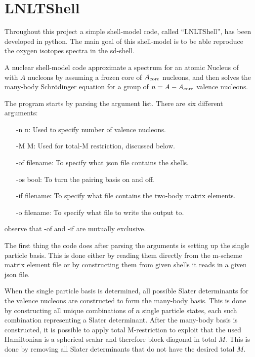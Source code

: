 \section{LNLTShell} \label{sec:CodeExpl}

Throughout this project a simple shell-model code, called ``LNLTShell'', has been developed in python. The main goal of this shell-model is to be able reproduce the oxygen isotopes spectra in the sd-shell.

A nuclear shell-model code approximate a spectrum for an atomic Nucleus of with \(A\) nucleons by assuming a frozen core of \(A_{\rm{core}}\) nucleons, and then solves the many-body Schrödinger equation %
for a group of \(n=A-A_{\rm{core}}\) valence nucleons.



The program starts by parsing the argument list. There are six different arguments:
\begin{itemize}
\item[-n n:] Used to specify number of valence nucleons.
\item[-M M:] Used for total-M restriction, discussed below.
\item[-of filename:] To specify what json file contains the shells.
\item[-os bool:] To turn the pairing basis on and off.
\item[-if filename:] To specify what file contains the two-body matrix elements.
\item[-o filename:] To specify what file to write the output to.
\end{itemize}
observe that -of and -if are mutually exclusive.




The first thing the code does after parsing the arguments is setting up the single particle basis.
This is done either by reading them directly from the m-scheme matrix element file %
or by constructing them from given shells it reads in a given json file.



When the single particle basis is determined, all possible Slater determinants for the valence nucleons are constructed to form the many-body basis.
This is done by constructing all unique combinations of \(n\) single particle states, each such combination representing a Slater determinant.
After the many-body basis is constructed, it is possible to apply total M-restriction to exploit that the used Hamiltonian is a spherical scalar and therefore block-diagonal in total \(M\). This is done by removing all Slater determinants that do not have the desired total \(M\).

